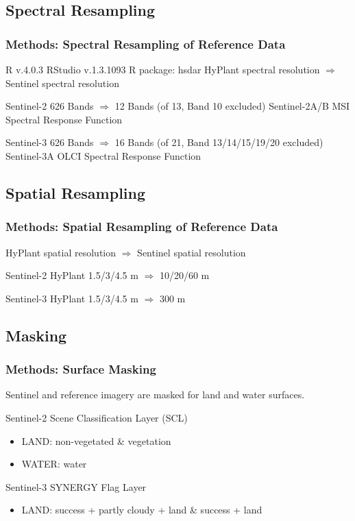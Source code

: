 \documentclass[9pt]{beamer}
\begin{document}
\subsection{Spectral Resampling}
\begin{frame}
\frametitle{Methods: Spectral Resampling of Reference Data}
R v.4.0.3\newline
RStudio v.1.3.1093\newline
R package: hsdar\newline\newline
HyPlant spectral resolution $\Rightarrow$ Sentinel spectral resolution
\begin{block}{Sentinel-2}
626 Bands $\Rightarrow$ 12 Bands (of 13, Band 10 excluded)\newline\newline
Sentinel-2A/B MSI Spectral Response Function
\end{block}
\begin{alertblock}{Sentinel-3}
626 Bands $\Rightarrow$ 16 Bands (of 21, Band 13/14/15/19/20 excluded)\newline\newline
Sentinel-3A OLCI Spectral Response Function
\end{alertblock}
\end{frame}

\subsection{Spatial Resampling}
\begin{frame}
\frametitle{Methods: Spatial Resampling of Reference Data}
HyPlant spatial resolution $\Rightarrow$ Sentinel spatial resolution
\begin{block}{Sentinel-2}
HyPlant 1.5/3/4.5 m $\Rightarrow$ 10/20/60 m
\end{block}
\begin{alertblock}{Sentinel-3}
HyPlant 1.5/3/4.5 m $\Rightarrow$ 300 m
\end{alertblock}
\end{frame}

\subsection{Masking}
\begin{frame}
\frametitle{Methods: Surface Masking}
Sentinel and reference imagery are masked for land and water surfaces.
\begin{block}{Sentinel-2}
Scene Classification Layer (SCL)
\begin{itemize}
\item LAND: non-vegetated \& vegetation
\item WATER: water
\end{itemize}
\end{block}
\begin{alertblock}{Sentinel-3}
SYNERGY Flag Layer
\begin{itemize}
\item LAND: success + partly cloudy + land \& success + land
\end{itemize}
\end{alertblock}
\end{frame}
\end{document}
